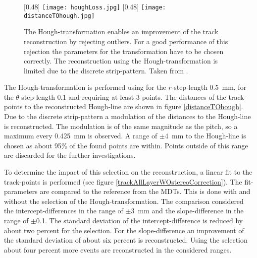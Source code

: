 \documentclass[
twoside,            %
BCOR1.4cm,          %
10pt,               %
headings=normal,    %
headsepline,        %
clearplainpage,		%
final,              %
div=14,
open=right,
bibliography=toc
]{scrreprt}
\begin{document}
\begin{figure}[!h]
	\centering
	[0.48\textwidth]
	{\texttt{[image: houghLoss.jpg]}}
	\hfill
	[0.48\textwidth]
	{\texttt{[image: distanceTOhough.jpg]}}
	\vspace{-2mm}
	\caption{
		The Hough-transformation enables an improvement of the track reconstruction by rejecting outliers.
		For a good performance of this rejection the parameters for the transformation have to be chosen correctly.
		The reconstruction using the Hough-transformation is limited due to the discrete strip-pattern.
		Taken from \cite{mohlThesis}.
	}
	\label{houghReconstruction}
\end{figure}

The Hough-transformation is performed using for the $r$-step-length \SI{0.5}{mm}, for the $\theta$-step-length 0.1 and requiring at least 3 points.
The distances of the track-points to the reconstructed Hough-line are shown in figure \ref{distanceTOhough}.
Due to the discrete strip-pattern a modulation of the distances to the Hough-line is reconstructed.
The modulation is of the same magnitude as the pitch, so a maximum every \SI{0.425}{mm} is observed.
A range of $\pm$\SI{4}{mm} to the Hough-line is chosen as about 95\% of the found points are within.
Points outside of this range are discarded for the further investigations.

To determine the impact of this selection on the reconstruction, a linear fit to the track-points is performed (see figure \ref{trackAllLayerWOstereoCorrection}).
The fit-parameters are compared to the reference from the MDTs.
This is done with and without the selection of the Hough-transformation.
The comparison considered the intercept-differences in the range of $\pm$\SI{3}{mm} and the slope-difference in the range of $\pm$0.1.
The standard deviation of the intercept-difference is reduced by about two percent for the selection.
For the slope-difference an improvement of the standard deviation of about six percent is reconstructed.
Using the selection about four percent more events are reconstructed in the considered ranges.
\end{document}

